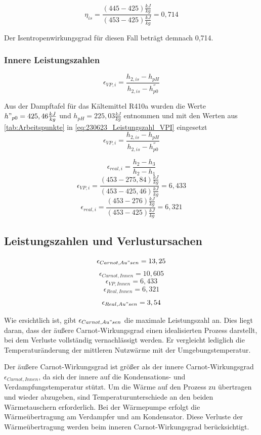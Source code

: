 $$\eta_{is}=\frac{(445-425)\frac{kJ}{kg}}{(453-425)\frac{kJ}{kg}}=0,714$$

Der Isentropenwirkungsgrad für diesen Fall beträgt demnach 0,714.\\


\subsubsection{Innere Leistungszahlen}

\begin{equation}
   \epsilon_{VP,i} = \frac{h_{2,is}-h_{pH}}{h_{2,is}-h^{''}_{p0}}
\label{eq:230623_Leistungszahl_VPI}
\end{equation}

Aus der Dampftafel für das Kältemittel R410a wurden die Werte $h"_{p0}=425,46 \frac{kJ}{kg}$ und $h_{pH}= 225,03 \frac{kJ}{kg}$ entnommen und mit den Werten aus \autoref{tab:Arbeitspunkte} in \autoref{eq:230623_Leistungszahl_VPI} eingesetzt
$$\epsilon_{VP,i} = \frac{h_{2,is}-h_{pH}}{h_{2,is}-h^{''}_{p0}}$$

\begin{equation}
    \epsilon_{real,i}= \frac{h_2-h_3}{h_2-h_1}
\end{equation}
$$\epsilon_{VP,i}= \frac{(453-275,84)\frac{kJ}{kg}}{(453-425,46)\frac{kJ}{kg}} = 6,433 $$
$$\epsilon_{real,i}= \frac{(453-276)\frac{kJ}{kg}}{(453-425)\frac{kJ}{kg}} = 6,321 $$

\subsection{Leistungszahlen und Verlustursachen}


$$\epsilon_{Carnot,Au"sen} = 13,25$$
$$\epsilon_{Carnot,Innen} = 10,605$$
$$\epsilon_{VP,Innen} = 6,433$$
$$\epsilon_{Real,Innen} = 6,321$$
$$\epsilon_{Real,Au"sen} = 3,54$$

Wie ersichtlich ist, gibt $\epsilon_{Carnot,Au"sen}$ die maximale Leistungszahl an. 
Dies liegt daran, dass der äußere Carnot-Wirkungsgrad einen idealisierten Prozess darstellt, bei dem Verluste vollständig vernachlässigt werden. 
Er vergleicht lediglich die Temperaturänderung der mittleren Nutzwärme mit der Umgebungstemperatur.

Der äußere Carnot-Wirkungsgrad ist größer als der innere Carnot-Wirkungsgrad $\epsilon_{Carnot,Innen}$, da sich der innere auf die Kondensations- und Verdampfungstemperatur stützt. 
Um die Wärme auf den Prozess zu übertragen und wieder abzugeben, sind Temperaturunterschiede an den beiden Wärmetauschern erforderlich. 
Bei der Wärmepumpe erfolgt die Wärmeübertragung am Verdampfer und am Kondensator. 
Diese Verluste der Wärmeübertragung werden beim inneren Carnot-Wirkungsgrad berücksichtigt.

